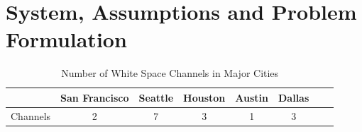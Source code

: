 \section{System, Assumptions and Problem Formulation}
\label{sec:problemformulation}

\begin{table}[t]
\centering %
\begin{tabular}{|l|c|c|c|c|c|c|c|} %
\hline %
 & San Francisco & Seattle & Houston & Austin & Dallas \\
\hline %
Channels & 2 & 7 & 3 & 1& 3 \\
\hline %
\end{tabular}
\caption{Number of White Space Channels in Major Cities} %
\label{tab:whitespacechannel}
\vspace{-0.3in}
\end{table}

